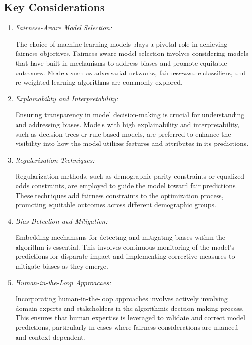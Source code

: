 \documentclass[12pt,a4paper,openright,twoside]{book}
\begin{document}
\subsection{Key Considerations}

\begin{enumerate}
    \item \emph{Fairness-Aware Model Selection:} 
    
    The choice of machine learning models plays a pivotal role in achieving fairness objectives. Fairness-aware model selection involves considering models that have built-in mechanisms to address biases and promote equitable outcomes. Models such as adversarial networks, fairness-aware classifiers, and re-weighted learning algorithms are commonly explored.

    \item \emph{Explainability and Interpretability:} 
    
    Ensuring transparency in model decision-making is crucial for understanding and addressing biases. Models with high explainability and interpretability, such as decision trees or rule-based models, are preferred to enhance the visibility into how the model utilizes features and attributes in its predictions.

    \item \emph{Regularization Techniques:} 
    
    Regularization methods, such as demographic parity constraints or equalized odds constraints, are employed to guide the model toward fair predictions. These techniques add fairness constraints to the optimization process, promoting equitable outcomes across different demographic groups.

    \item \emph{Bias Detection and Mitigation:} 
    
    Embedding mechanisms for detecting and mitigating biases within the algorithm is essential. This involves continuous monitoring of the model's predictions for disparate impact and implementing corrective measures to mitigate biases as they emerge.

    \item \emph{Human-in-the-Loop Approaches:} 
    
    Incorporating human-in-the-loop approaches involves actively involving domain experts and stakeholders in the algorithmic decision-making process. This ensures that human expertise is leveraged to validate and correct model predictions, particularly in cases where fairness considerations are nuanced and context-dependent.


\end{enumerate}
\end{document}
